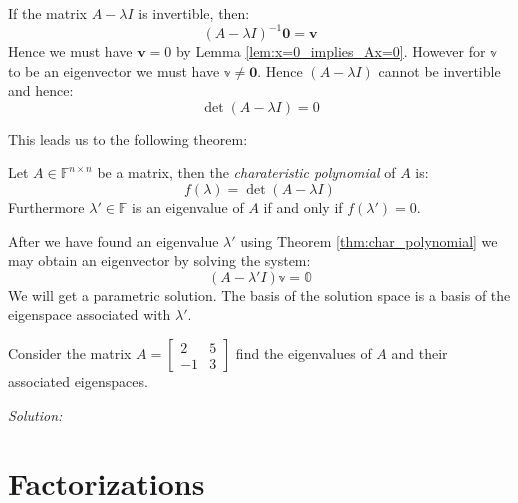 \documentclass[11pt,a4paper,oneside,openright,english]{article}
\begin{document}
If the matrix $A - \lambda I$ is invertible, then:
\begin{equation*}
  (A - \lambda I)^{-1}\mathbf{0} = \mathbf{v}
\end{equation*}
Hence we must have $\mathbf{v} = 0$ by Lemma \ref{lem:x=0_implies_Ax=0}. However for $\mathbb{v}$ to be an eigenvector we must have $\mathbb{v} \neq \mathbf{0}$. Hence $(A - \lambda I)$ cannot be invertible and hence:
\begin{equation*}
  \det(A - \lambda I) = 0
\end{equation*}

This leads us to the following theorem:
\begin{theorem}\label{thm:char_polynomial}
  Let $A \in \mathbb{F}^{n \times n}$ be a matrix, then the \textit{charateristic polynomial} of $A$ is:
  \begin{equation*}
    f(\lambda) = \det(A - \lambda I)
  \end{equation*}
  Furthermore $\lambda' \in \mathbb{F}$ is an eigenvalue of $A$ if and only if $f(\lambda') = 0$.
\end{theorem}

After we have found an eigenvalue $\lambda'$ using Theorem \ref{thm:char_polynomial} we may obtain an eigenvector by solving the system:
\begin{equation*}
  (A - \lambda'I) \mathbb{v} = \mathbb{0}
\end{equation*}
We will get a parametric solution. The basis of the solution space is a basis of the eigenspace associated with $\lambda'$.

\begin{example}\label{exmp:eigen_value_using_char_polynomial}
  Consider the matrix $A = \begin{bmatrix} 2 & 5 \\ -1 & 3 \end{bmatrix}$ find the eigenvalues of $A$ and their associated eigenspaces.

  \textit{Solution:}
\end{example}


\section{Factorizations}







%
\end{document}
